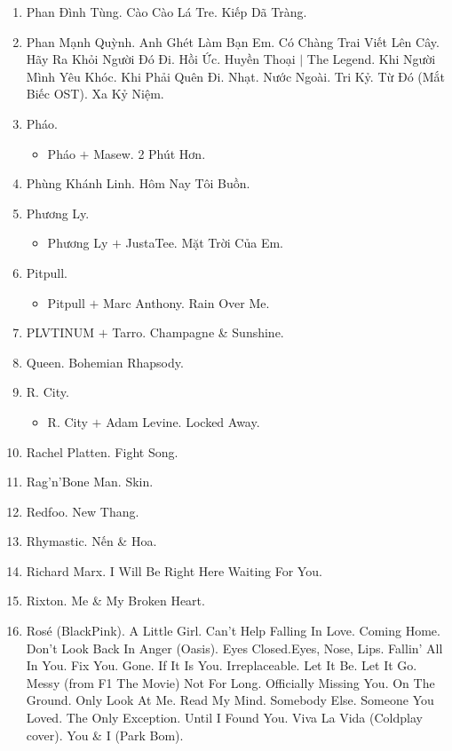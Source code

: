 \documentclass{article}
\begin{document}
\begin{enumerate}
	\item {\sc Phan Đình Tùng.} Cào Cào Lá Tre. Kiếp Dã Tràng.
	\item {\sc Phan Mạnh Quỳnh.} Anh Ghét Làm Bạn Em. Có Chàng Trai Viết Lên Cây. Hãy Ra Khỏi Người Đó Đi. Hồi Ức. Huyền Thoại $|$ The Legend. Khi Người Mình Yêu Khóc. Khi Phải Quên Đi. Nhạt. Nước Ngoài. Tri Kỷ. Từ Đó (Mắt Biếc OST). Xa Kỷ Niệm.
	\item {\sc Pháo.}
	\begin{itemize}
		\item {\sc Pháo $+$ Masew.} 2 Phút Hơn.
	\end{itemize}
	\item {\sc Phùng Khánh Linh.} Hôm Nay Tôi Buồn.
	\item {\sc Phương Ly.}
	\begin{itemize}
		\item {\sc Phương Ly $+$ JustaTee.} Mặt Trời Của Em.
	\end{itemize}
	\item {\sc Pitpull.}
	\begin{itemize}
		\item {\sc Pitpull $+$ Marc Anthony.} Rain Over Me.
	\end{itemize}
	\item {\sc PLVTINUM $+$ Tarro.} Champagne \& Sunshine.
	\item {\sc Queen.} Bohemian Rhapsody.
	\item {\sc R. City.}
	\begin{itemize}
		\item {\sc R. City $+$ Adam Levine.} Locked Away.
	\end{itemize}
	\item {\sc Rachel Platten.} Fight Song.
	\item {\sc Rag'n'Bone Man.} Skin.
	\item {\sc Redfoo.} New Thang.
	\item {\sc Rhymastic.} Nến \& Hoa.
	\item {\sc Richard Marx.} I Will Be Right Here Waiting For You.
	\item {\sc Rixton.} Me \& My Broken Heart.
	\item {\sc Ros\'e (BlackPink).} A Little Girl. Can't Help Falling In Love. Coming Home. Don't Look Back In Anger (Oasis). Eyes Closed.Eyes, Nose, Lips. Fallin' All In You. Fix You. Gone. If It Is You. Irreplaceable. Let It Be. Let It Go. Messy (from F1 The Movie) Not For Long. Officially Missing You. On The Ground. Only Look At Me. Read My Mind. Somebody Else. Someone You Loved. The Only Exception. Until I Found You. Viva La Vida (Coldplay cover). You \& I (Park Bom).

\end{enumerate}
\end{document}
